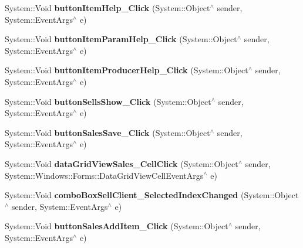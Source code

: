 \begin{DoxyCompactItemize}
System\+::\+Void {\bfseries button\+Item\+Help\+\_\+\+Click} (System\+::\+Object$^\wedge$ sender, System\+::\+Event\+Args$^\wedge$ e)
\item 
\hypertarget{class_magazyn_1_1_magazin_a38bf656bd772b4f6fdecf4ec12c4ec2b}{}\label{class_magazyn_1_1_magazin_a38bf656bd772b4f6fdecf4ec12c4ec2b} 
System\+::\+Void {\bfseries button\+Item\+Param\+Help\+\_\+\+Click} (System\+::\+Object$^\wedge$ sender, System\+::\+Event\+Args$^\wedge$ e)
\item 
\hypertarget{class_magazyn_1_1_magazin_ad14b33f28c78af93c07d61507ec82d13}{}\label{class_magazyn_1_1_magazin_ad14b33f28c78af93c07d61507ec82d13} 
System\+::\+Void {\bfseries button\+Item\+Producer\+Help\+\_\+\+Click} (System\+::\+Object$^\wedge$ sender, System\+::\+Event\+Args$^\wedge$ e)
\item 
\hypertarget{class_magazyn_1_1_magazin_ae23692db5f25cc766e5bd6214354cfb2}{}\label{class_magazyn_1_1_magazin_ae23692db5f25cc766e5bd6214354cfb2} 
System\+::\+Void {\bfseries button\+Sells\+Show\+\_\+\+Click} (System\+::\+Object$^\wedge$ sender, System\+::\+Event\+Args$^\wedge$ e)
\item 
\hypertarget{class_magazyn_1_1_magazin_ab8d1673031a48aefbd7dfcfcb951393d}{}\label{class_magazyn_1_1_magazin_ab8d1673031a48aefbd7dfcfcb951393d} 
System\+::\+Void {\bfseries button\+Sales\+Save\+\_\+\+Click} (System\+::\+Object$^\wedge$ sender, System\+::\+Event\+Args$^\wedge$ e)
\item 
\hypertarget{class_magazyn_1_1_magazin_a29c710017ebfa3a262931fba0b75f316}{}\label{class_magazyn_1_1_magazin_a29c710017ebfa3a262931fba0b75f316} 
System\+::\+Void {\bfseries data\+Grid\+View\+Sales\+\_\+\+Cell\+Click} (System\+::\+Object$^\wedge$ sender, System\+::\+Windows\+::\+Forms\+::\+Data\+Grid\+View\+Cell\+Event\+Args$^\wedge$ e)
\item 
\hypertarget{class_magazyn_1_1_magazin_a276657fae69adc303e1c88b4441b3e47}{}\label{class_magazyn_1_1_magazin_a276657fae69adc303e1c88b4441b3e47} 
System\+::\+Void {\bfseries combo\+Box\+Sell\+Client\+\_\+\+Selected\+Index\+Changed} (System\+::\+Object$^\wedge$ sender, System\+::\+Event\+Args$^\wedge$ e)
\item 
\hypertarget{class_magazyn_1_1_magazin_aaa3f43ca8cd10efe0358e70258822e37}{}\label{class_magazyn_1_1_magazin_aaa3f43ca8cd10efe0358e70258822e37} 
System\+::\+Void {\bfseries button\+Sales\+Add\+Item\+\_\+\+Click} (System\+::\+Object$^\wedge$ sender, System\+::\+Event\+Args$^\wedge$ e)
\item 
\hypertarget{class_magazyn_1_1_magazin_a27eca229d3b3cff68414eb63c62964d2}{}\label{class_magazyn_1_1_magazin_a27eca229d3b3cff68414eb63c62964d2} 

\end{DoxyCompactItemize}
